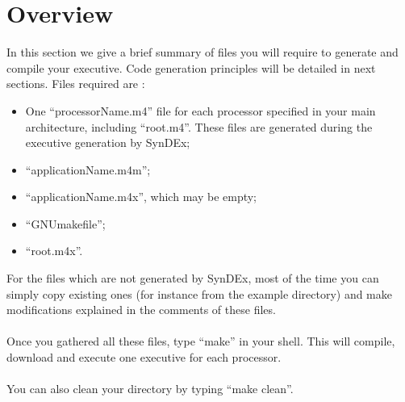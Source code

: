 \documentclass[11pt,twoside]{report}
\begin{document}
\section{Overview}
In this section we give a brief summary of files you will require to
generate and compile your executive. Code generation principles will be
detailed in next sections. Files required are :
\begin{itemize}
\item One ``processorName.m4'' file for each processor specified in your main
  architecture, including ``root.m4''. These files are generated during the executive
  generation by SynDEx;
\item ``applicationName.m4m'';
\item ``applicationName.m4x'', which may be empty;
\item ``GNUmakefile'';
\item ``root.m4x''.
\end{itemize}
For the files which are not generated by SynDEx, most of the time you
can simply copy existing ones (for instance from the example directory)
and make modifications explained in the comments of these files.\\\\
Once you gathered all these files, type ``make'' in your shell. This
will compile, download and execute one executive for each
processor.\\\\
You can also clean your directory by typing ``make clean''.
\end{document}
